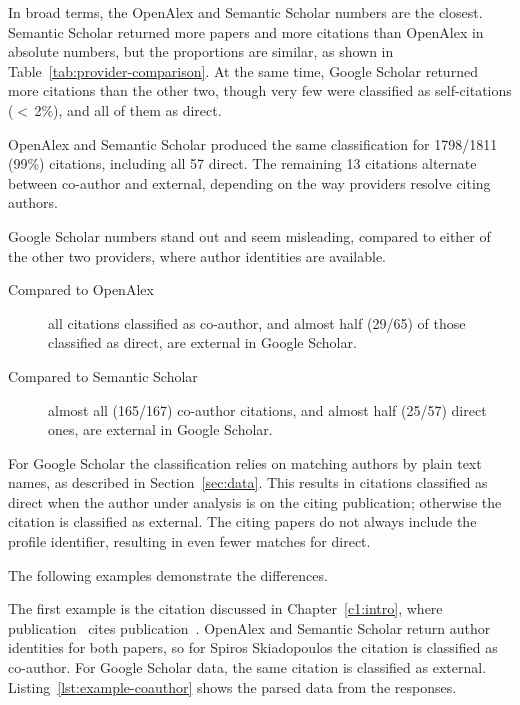 In broad terms, the \textsf{OpenAlex} and \textsf{Semantic Scholar} numbers are the closest.
\textsf{Semantic Scholar} returned more papers and more citations than \textsf{OpenAlex} in absolute numbers, but the proportions are similar, as shown in Table~\ref{tab:provider-comparison}.
At the same time, \textsf{Google Scholar} returned more citations than the other two, though very few were classified as self-citations ($<$\,2\%), and all of them as \textsf{direct}.

\textsf{OpenAlex} and \textsf{Semantic Scholar} produced the same classification for 1798/1811 (99\%) citations, including all 57 \textsf{direct}.
The remaining 13 citations alternate between \textsf{co-author} and \textsf{external}, depending on the way providers resolve citing authors.

\textsf{Google Scholar} numbers stand out and seem misleading, compared to either of the other two providers, where author identities are available.

\begin{description}
    \item [Compared to \textsf{OpenAlex}] all citations classified as \textsf{co-author}, and almost half (29/65) of those classified as \textsf{direct}, are \textsf{external} in \textsf{Google Scholar}.
    \item [Compared to \textsf{Semantic Scholar}] almost all (165/167) \textsf{co-author} citations, and almost half (25/57) \textsf{direct} ones, are \textsf{external} in \textsf{Google Scholar}.
\end{description}

For \textsf{Google Scholar} the classification relies on matching authors by plain text names, as described in Section~\ref{sec:data}.
This results in citations classified as \textsf{direct} when the author under analysis is on the citing publication; otherwise the citation is classified as \textsf{external}.
The citing papers do not always include the profile identifier, resulting in even fewer matches for \textsf{direct}.

The following examples demonstrate the differences.

The first example is the citation discussed in Chapter~\ref{c1:intro}, where publication~\cite{Kalnis2007} cites publication~\cite{Ghinita2007}.
\textsf{OpenAlex} and \textsf{Semantic Scholar} return author identities for both papers, so for Spiros Skiadopoulos the citation is classified as \textsf{co-author}.
For \textsf{Google Scholar} data, the same citation is classified as \textsf{external}.
Listing~\ref{lst:example-coauthor} shows the parsed data from the responses.

